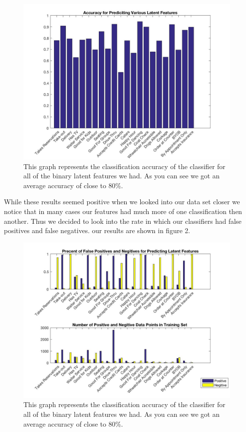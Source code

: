\documentclass{article}
\begin{document}
\begin{figure}[h]
\centering
\includegraphics[scale = .4]{../fpAccuracy}
\caption{This graph represents the classification accuracy of the classifier for all of the binary latent features we had. As you can see we got an average accuracy of close to 80\%.}
\end{figure}

While these results seemed positive when we looked into our data set closer we notice that in many cases our features had much more of one classification then another. Thus we decided to look into the rate in which our classifiers had false positives and false negatives. our results are shown in figure 2.

\begin{figure}
\includegraphics[scale = .4]{../fpPlot}
\caption{This graph represents the classification accuracy of the classifier for all of the binary latent features we had. As you can see we got an average accuracy of close to 80\%.}
\end{figure}
\end{document}
